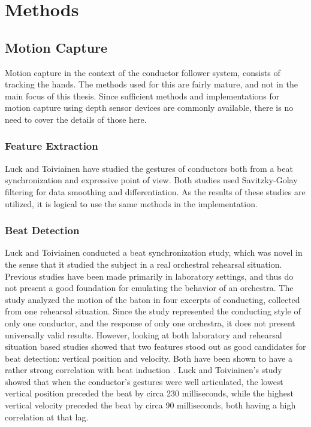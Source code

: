 \chapter{Methods}
\label{chapter:methods}


\section{Motion Capture}

Motion capture in the context of the conductor follower system,
consists of tracking the hands.
The methods used for this are fairly mature,
and not in the main focus of this thesis.
Since sufficient methods and implementations for
motion capture using depth sensor devices
are commonly available,
there is no need to cover the details of those here.


\subsection{Feature Extraction}

Luck and Toiviainen have studied the gestures of conductors
both from a beat synchronization \cite{luck2006}
and expressive \cite{luck2010} point of view.
Both studies used Savitzky-Golay filtering \cite{savitzky1964}
for data smoothing and differentiation.
As the results of these studies are utilized,
it is logical to use the same methods in the implementation.

\subsection{Beat Detection}


Luck and Toiviainen \cite{luck2006}
conducted a beat synchronization study,
which was novel in the sense that it studied
the subject in a real orchestral rehearsal situation.
Previous studies have been made primarily in laboratory settings,
and thus do not present a good foundation
for emulating the behavior of an orchestra.
The study analyzed the motion of the baton
in four excerpts of conducting,
collected from one rehearsal situation.
Since the study represented the conducting style of only one conductor,
and the response of only one orchestra,
it does not present universally valid results.
However, looking at both laboratory and rehearsal situation based studies showed
that two features stood out as good candidates for beat detection:
vertical position and velocity.
Both have been shown to have a
rather strong correlation with beat induction \cite{add citations}.
Luck and Toiviainen's study showed that when the conductor's gestures were well articulated,
the lowest vertical position preceded the beat by circa 230 milliseconds,
while the highest vertical velocity preceded the beat by circa 90 milliseconds,
both having a high correlation at that lag.



